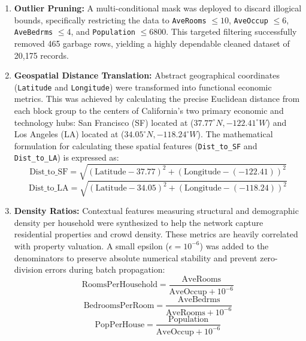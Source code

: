 \documentclass[a4paper,12pt]{extarticle}
\begin{document}
\begin{enumerate}
    \item \textbf{Outlier Pruning:} A multi-conditional mask was deployed to discard illogical bounds, specifically restricting the data to \texttt{AveRooms} $\le 10$, \texttt{AveOccup} $\le 6$, \texttt{AveBedrms} $\le 4$, and \texttt{Population} $\le 6800$. This targeted filtering successfully removed 465 garbage rows, yielding a highly dependable cleaned dataset of 20,175 records.
    \item \textbf{Geospatial Distance Translation:} Abstract geographical coordinates (\texttt{Latitude} and \texttt{Longitude}) were transformed into functional economic metrics. This was achieved by calculating the precise Euclidean distance from each block group to the centers of California's two primary economic and technology hubs: San Francisco (SF) located at ($37.77^\circ N, -122.41^\circ W$) and Los Angeles (LA) located at ($34.05^\circ N, -118.24^\circ W$). The mathematical formulation for calculating these spatial features (\texttt{Dist\_to\_SF} and \texttt{Dist\_to\_LA}) is expressed as:
    \begin{equation}
        \text{Dist\_to\_SF} = \sqrt{(\text{Latitude} - 37.77)^2 + (\text{Longitude} - (-122.41))^2}
    \end{equation}
    \begin{equation}
        \text{Dist\_to\_LA} = \sqrt{(\text{Latitude} - 34.05)^2 + (\text{Longitude} - (-118.24))^2}
    \end{equation}
    \item \textbf{Density Ratios:} Contextual features measuring structural and demographic density per household were synthesized to help the network capture residential properties and crowd density. These metrics are heavily correlated with property valuation. A small epsilon ($\epsilon = 10^{-6}$) was added to the denominators to preserve absolute numerical stability and prevent zero-division errors during batch propagation:
    \begin{equation}
        \text{RoomsPerHousehold} = \frac{\text{AveRooms}}{\text{AveOccup} + 10^{-6}}
    \end{equation}
    \begin{equation}
        \text{BedroomsPerRoom} = \frac{\text{AveBedrms}}{\text{AveRooms} + 10^{-6}}
    \end{equation}
    \begin{equation}
        \text{PopPerHouse} = \frac{\text{Population}}{\text{AveOccup} + 10^{-6}}
    \end{equation}

\end{enumerate}
\end{document}
